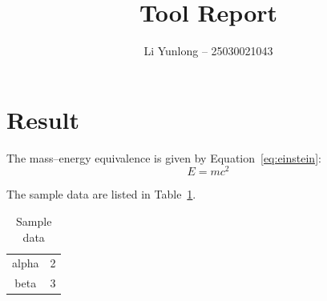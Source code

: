 \documentclass{article}
\begin{document}
\title{Tool Report}
\author{Li Yunlong -- 25030021043}
\maketitle
\section{Result}

The mass--energy equivalence is given by Equation~\eqref{eq:einstein}:
\begin{equation}
    E = mc^2
    \label{eq:einstein}
\end{equation}

The sample data are listed in Table~\ref{tab:sample}.
\begin{table}[h]
    \centering
    \caption{Sample data}
    \label{tab:sample}
    \begin{tabular}{cc}
        \hline
        alpha & 2 \\
        beta  & 3 \\
        \hline
    \end{tabular}
\end{table}
\end{document}
